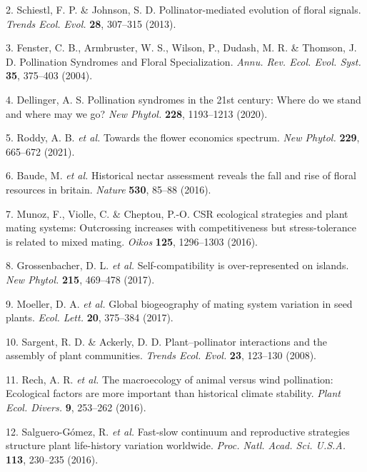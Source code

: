 \documentclass[12pt,a4paper,]{article}
\begin{document}
\hypertarget{ref-schiestl2013}{}
2. Schiestl, F. P. \& Johnson, S. D. Pollinator-mediated evolution of
floral signals. \emph{Trends Ecol. Evol.} \textbf{28}, 307--315 (2013).

\hypertarget{ref-fenster2004}{}
3. Fenster, C. B., Armbruster, W. S., Wilson, P., Dudash, M. R. \&
Thomson, J. D. Pollination Syndromes and Floral Specialization.
\emph{Annu. Rev. Ecol. Evol. Syst.} \textbf{35}, 375--403 (2004).

\hypertarget{ref-dellinger2020}{}
4. Dellinger, A. S. Pollination syndromes in the 21st century: Where do
we stand and where may we go? \emph{New Phytol.} \textbf{228},
1193--1213 (2020).

\hypertarget{ref-roddy2021}{}
5. Roddy, A. B. \emph{et al.} Towards the flower economics spectrum.
\emph{New Phytol.} \textbf{229}, 665--672 (2021).

\hypertarget{ref-baude2016}{}
6. Baude, M. \emph{et al.} Historical nectar assessment reveals the fall
and rise of floral resources in britain. \emph{Nature} \textbf{530},
85--88 (2016).

\hypertarget{ref-munoz2016}{}
7. Munoz, F., Violle, C. \& Cheptou, P.-O. CSR ecological strategies and
plant mating systems: Outcrossing increases with competitiveness but
stress-tolerance is related to mixed mating. \emph{Oikos} \textbf{125},
1296--1303 (2016).

\hypertarget{ref-grossenbacher2017}{}
8. Grossenbacher, D. L. \emph{et al.} Self-compatibility is
over-represented on islands. \emph{New Phytol.} \textbf{215}, 469--478
(2017).

\hypertarget{ref-moeller2017}{}
9. Moeller, D. A. \emph{et al.} Global biogeography of mating system
variation in seed plants. \emph{Ecol. Lett.} \textbf{20}, 375--384
(2017).

\hypertarget{ref-sargent2008}{}
10. Sargent, R. D. \& Ackerly, D. D. Plant--pollinator interactions and
the assembly of plant communities. \emph{Trends Ecol. Evol.}
\textbf{23}, 123--130 (2008).

\hypertarget{ref-rech2016}{}
11. Rech, A. R. \emph{et al.} The macroecology of animal versus wind
pollination: Ecological factors are more important than historical
climate stability. \emph{Plant Ecol. Divers.} \textbf{9}, 253--262
(2016).

\hypertarget{ref-salguero2016}{}
12. Salguero-Gómez, R. \emph{et al.} Fast-slow continuum and
reproductive strategies structure plant life-history variation
worldwide. \emph{Proc. Natl. Acad. Sci. U.S.A.} \textbf{113}, 230--235
(2016).
\end{document}
